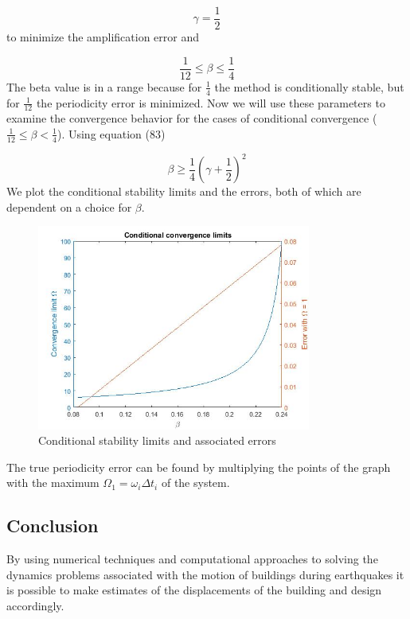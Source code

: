 \documentclass{article}
\begin{document}
				\begin{equation*}
					\gamma = \frac{1}{2}
				\end{equation*}
to minimize the amplification error and

				\begin{equation*}
					 \frac{1}{12} \leq \beta \leq  \frac{1}{4}
				\end{equation*}
The beta value is in a range because for $\frac{1}{4}$ the method is conditionally stable, but for $\frac{1}{12}$ the periodicity error is minimized. Now we will use these parameters to examine the convergence behavior for the cases of conditional convergence ($ \frac{1}{12} \leq \beta <  \frac{1}{4}$). Using equation (83)

				\begin{equation*}
					\beta \geq \frac{1}{4}\left(\gamma + \frac{1}{2}\right)^2
				\end{equation*}
We plot the conditional stability limits and the errors, both of which are dependent on a choice for $\beta$. 

				\begin{figure}[h!]
   					 \centering
   					 \includegraphics[width=90mm]{pictures/ccl3.jpg}
   					 \caption{Conditional stability limits and associated errors}
				            \label{fig17}
  				\end{figure}
The true periodicity error can be found by multiplying the points of the graph with the maximum $\Omega_1 = \omega_i\Delta t_i$ of the system.


	\subsection{Conclusion}
By using numerical techniques and computational approaches to solving the dynamics problems associated with the motion of buildings during earthquakes it is possible to make estimates of the displacements of the building and design accordingly.
\end{document}
